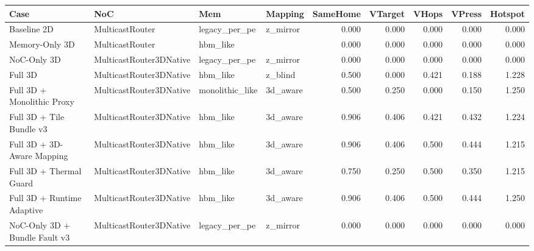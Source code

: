 \begin{tabular}{l l l l r r r r r}
\hline
Case & NoC & Mem & Mapping & SameHome & VTarget & VHops & VPress & Hotspot \\
\hline
Baseline 2D & MulticastRouter & legacy\_per\_pe & z\_mirror & 0.000 & 0.000 & 0.000 & 0.000 & 0.000 \\
Memory-Only 3D & MulticastRouter & hbm\_like &  & 0.000 & 0.000 & 0.000 & 0.000 & 0.000 \\
NoC-Only 3D & MulticastRouter3DNative & legacy\_per\_pe & z\_mirror & 0.000 & 0.000 & 0.000 & 0.000 & 0.000 \\
Full 3D & MulticastRouter3DNative & hbm\_like & z\_blind & 0.500 & 0.000 & 0.421 & 0.188 & 1.228 \\
Full 3D + Monolithic Proxy & MulticastRouter3DNative & monolithic\_like & 3d\_aware & 0.500 & 0.250 & 0.000 & 0.150 & 1.250 \\
Full 3D + Tile Bundle v3 & MulticastRouter3DNative & hbm\_like & 3d\_aware & 0.906 & 0.406 & 0.421 & 0.432 & 1.224 \\
Full 3D + 3D-Aware Mapping & MulticastRouter3DNative & hbm\_like & 3d\_aware & 0.906 & 0.406 & 0.500 & 0.444 & 1.215 \\
Full 3D + Thermal Guard & MulticastRouter3DNative & hbm\_like & 3d\_aware & 0.750 & 0.250 & 0.500 & 0.350 & 1.215 \\
Full 3D + Runtime Adaptive & MulticastRouter3DNative & hbm\_like & 3d\_aware & 0.906 & 0.406 & 0.500 & 0.444 & 1.250 \\
NoC-Only 3D + Bundle Fault v3 & MulticastRouter3DNative & legacy\_per\_pe & z\_mirror & 0.000 & 0.000 & 0.000 & 0.000 & 0.000 \\
\hline
\end{tabular}
